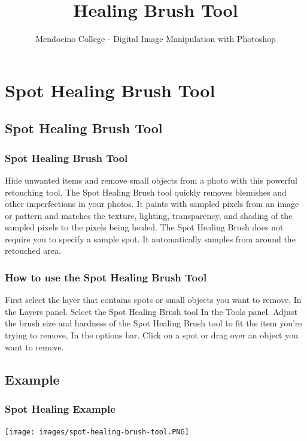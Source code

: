 \documentclass{beamer}
\title{Healing Brush Tool}
\author{Mendocino College - Digital Image Manipulation with Photoshop}
\date{\vspace{-5em}}
\begin{document}
	{
		\begin{frame}
			\vspace{-35pt}
			\maketitle
		\end{frame}
	}


		\section{Spot Healing Brush Tool}
			\subsection{Spot Healing Brush Tool}		
			\begin{frame}
				\frametitle{Spot Healing Brush Tool}
				\begin{outline}
					\1 Hide unwanted items and remove small objects from a photo with this powerful retouching tool.
					\1 The Spot Healing Brush tool quickly removes blemishes and other imperfections in your photos. 
					\1 It paints with sampled pixels from an image or pattern and matches the texture, lighting, transparency, and shading of the sampled pixels to the pixels being healed. 
					\1 The Spot Healing Brush does not require you to specify a sample spot. 
					\2 It automatically samples from around the retouched area.
				\end{outline}
			
			\end{frame}
					\begin{frame}
			\frametitle{How to use the Spot Healing Brush Tool}
			\begin{outline}
				\1 First select the layer that contains spots or small objects you want to remove, In the Layers panel.
				\1 Select the Spot Healing Brush tool In the Tools panel.
				\1 Adjust the brush size and hardness of the Spot Healing Brush tool to fit the item you’re trying to remove, In the options bar.
				\1 Click on a spot or drag over an object you want to remove. 
			\end{outline}
		\end{frame}

	\subsection{Example}		
	\begin{frame}
		\frametitle{Spot Healing Example}
		\begin{center}
			\texttt{[image: images/spot-healing-brush-tool.PNG]}
		\end{center}
	\end{frame}
\end{document}
